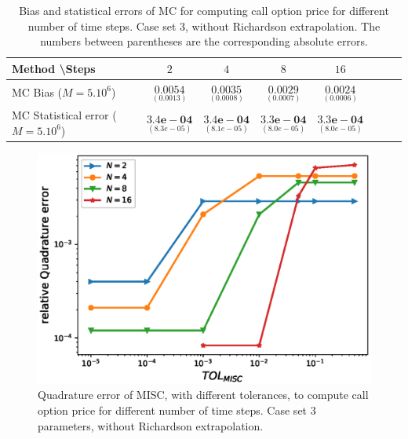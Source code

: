 \begin{table}[h!]
	\centering
	\begin{tabular}{l*{6}{c}r}
		Method \textbackslash  Steps            & $2$ & $4$ & $8$ & $16$  \\
		\hline
		MC Bias ($M=5.10^6$)   & 	$ \underset{(    0.0013)}{\mathbf{0.0054}}$  & $\underset{(0.0008)}{\mathbf{0.0035
		}}$  & $\underset{(0.0007)}{\mathbf{0.0029}}$ & $\underset{(0.0006)}{\mathbf{0.0024}}$\\ 
		
		MC Statistical error ($M=5.10^6$)  &  $\underset{(   8.3e-05)} {\mathbf{3.4e-04}}$  & $\underset{(8.1e-05)} {\mathbf{3.4e-04}}$  & $\underset{(8.0e-05)} {\mathbf{3.3e-04 }}$ & $\underset{(8.0e-05)} {\mathbf{3.3e-04}}$	\\
		
		\hline
	\end{tabular}
	\caption{Bias and statistical errors of MC   for computing call option price  for different number of time steps. Case set $3$, without Richardson extrapolation. The numbers between parentheses are the corresponding absolute errors.}
	\label{Bias and Statistical errors of MC ($M=5.10^6$)  for computing Call option price  for different number of time steps. Case set 4, without Richardson extrapolation. The numbers between parentheses are the corresponding absolute errors.}
\end{table}


\FloatBarrier


\begin{figure}[h!]
	\centering
	\includegraphics[width=0.35\linewidth]{./figures/rBergomi_MISC_quadratre_error/vs_TOL/set6/relative_quad_error_wrt_MISC_TOL_set6_non_rich}
	
	
	\caption{Quadrature error of MISC, with different tolerances, to compute call option price  for different number of time steps. Case  set $3$ parameters, without Richardson extrapolation.}
	\label{fig:Quadrature_error_set4}
\end{figure}



